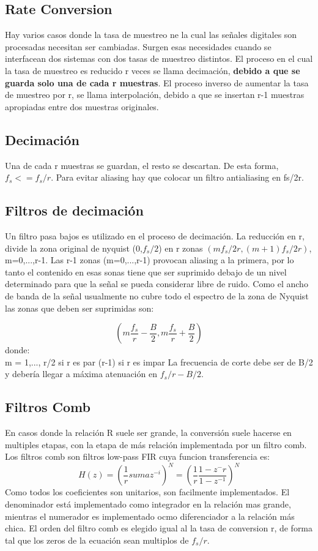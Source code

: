 \documentclass[assd_tp3_main.tex]{subfiles}
\begin{document}
\subsection{Rate Conversion}
Hay varios casos donde la tasa de muestreo ne la cual las señales digitales son procesadas necesitan ser cambiadas. Surgen esas necesidades cuando se interfacean dos sistemas con dos tasas de muestreo distintos. El proceso en el cual  la tasa de muestreo es reducido r veces se llama decimación, \textbf{debido a que se guarda solo una de cada r muestras}.
El proceso inverso de aumentar la tasa de muestreo por r, se llama interpolación, debido a que se insertan r-1 muestras apropiadas entre dos muestras originales.
\subsection{Decimación}
Una de cada r muestras se guardan, el resto se descartan. 
De esta forma, $f_s<=f_s/r$. Para evitar aliasing hay que colocar un filtro antialiasing en fs/2r.

\subsection{Filtros de decimación}
Un filtro pasa bajos es utilizado en el proceso de decimación. La reducción en r, divide la zona original de nyquist (0,$f_s/2$) en r zonas $(mf_s/2r,(m+1)f_s/2r)$, m=0,...,r-1. Las r-1 zonas (m=0,...,r-1) provocan aliasing a la primera, por lo tanto el contenido en esas sonas tiene que ser suprimido debajo de un nivel determinado para que la señal se pueda considerar libre de ruido. Como el ancho de banda de la señal usualmente no cubre todo el espectro de la zona de Nyquist las zonas que deben ser suprimidas son:

\[ (m\frac{f_s}{r}-\frac{B}{2},m\frac{f_s}{r}+\frac{B}{2}) \]
donde:\\
m = 1,...,
r/2 si r es par
(r-1) si r es impar 
La frecuencia de corte debe ser de B/2 y debería llegar a máxima atenuación en $f_s/r-B/2$.
\subsection{Filtros Comb}
En casos donde la relación R suele ser grande, la conversión suele hacerse en multiples etapas, con la etapa de más relación implementada por un filtro comb.
Los filtros comb son filtros low-pass FIR cuya funcion transferencia es:
\[ H(z)=(\frac{1}{r}suma z^{-i})^N=(\frac{1}{r}\frac{1-z^-{r}}{1-z^{-1}})^N \]
Como todos los coeficientes son unitarios, son facilmente implementados.
El denominador está implementado como integrador en la relación mas grande, mientras el numerador es implementado ocmo diferenciador a la relación más chica. El orden del filtro comb es elegido igual al la tasa de conversion r, de forma tal que los zeros de la ecuación sean multiplos de $f_s/r$.
\end{document}
